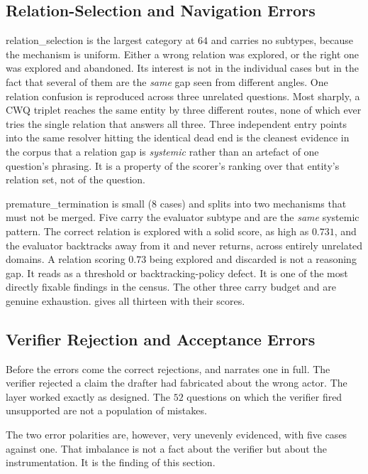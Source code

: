 \subsection{Relation-Selection and Navigation Errors}\label{sec:relation-errors}

\textsf{relation\_selection} is the largest category at $64$ and carries no
subtypes, because the mechanism is uniform. Either a wrong relation was
explored, or the right one was explored and abandoned. Its interest is not in
the individual cases but in the fact that several of them are the \emph{same}
gap seen from different angles. One relation confusion is reproduced across
three unrelated questions. Most sharply, a CWQ triplet reaches the same entity
by three different routes, none of which ever tries the single relation that
answers all three. Three independent entry points into the same resolver hitting
the identical dead end is the cleanest evidence in the corpus that a relation
gap is \emph{systemic} rather than an artefact of one question's phrasing. It is
a property of the scorer's ranking over that entity's relation set, not of the
question.

\textsf{premature\_termination} is small ($8$ cases) and splits into two
mechanisms that must not be merged. Five carry the
\textsf{evaluator} subtype and are the \emph{same} systemic pattern. The correct
relation is explored with a solid score, as high as $0.731$, and the evaluator
backtracks away from it and never returns, across entirely unrelated domains. A
relation scoring $0.73$ being explored and discarded is not a reasoning gap. It
reads as a threshold or backtracking-policy defect. It is one of the most
directly fixable findings in the census. The other three carry \textsf{budget}
and are genuine exhaustion.  gives all thirteen with
their scores.

\subsection{Verifier Rejection and Acceptance Errors}\label{sec:verifier-errors}

Before the errors come the correct rejections, and 
narrates one in full. The verifier rejected a claim the drafter had fabricated
about the wrong actor. The layer worked exactly as designed. The $52$ questions
on which the verifier fired \textsf{unsupported} are not a population of
mistakes.

The two error polarities are, however, very unevenly evidenced, with five cases
against one. That imbalance is not a fact about the verifier but about the
instrumentation. It is the finding of this section.

